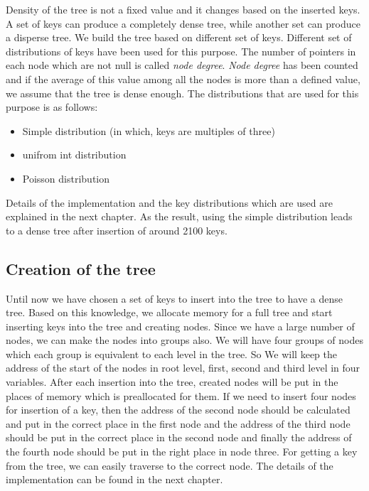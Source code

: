 \documentclass[12pt]{report}
\begin{document}
Density of the tree is not a fixed value and it changes based on the inserted keys. A set of keys can produce a completely dense tree, while another set can produce a disperse tree.
 We build the tree based on different set of keys. Different set of distributions of keys have been used for this purpose. The number of pointers in each node which are not null is called \textit{node degree}. \textit{Node degree} has been counted and if the average of this value among all the nodes is more than a defined value, we assume that the tree is dense enough. The distributions that are used for this purpose is as follows:
 \begin{itemize}
 \item Simple distribution (in which, keys are multiples of three)
 \item unifrom int distribution
 \item Poisson distribution
 \end{itemize}
Details of the implementation and the key distributions which are used are explained in the next chapter. As the result, using the simple distribution leads to a dense tree after insertion of around 2100 keys.
 
\subsection{Creation of the tree}
  
Until now we have chosen a set of keys to insert into the tree to have a dense tree. Based on this knowledge, we allocate memory for a full tree and start inserting keys into the tree and creating nodes. Since we have a large number of nodes, we can make the nodes into groups also. We will have four groups of nodes which each group is equivalent to each level in the tree. So We will keep the address of the start of the nodes in root level, first, second and third level in four variables. After each insertion into the tree, created nodes will be put in the places of memory which is preallocated for them. If we need to insert four nodes for insertion of a key, then the address of the second node should be calculated and put in the correct place in the first node and the address of the third node should be put in the correct place in the second node and finally the address of the fourth node should be put in the right place in node three. For getting a key from the tree, we can easily traverse to the correct node. The details of the implementation can be found in the next chapter. 
\end{document}
